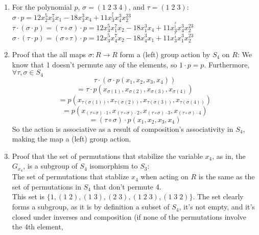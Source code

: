 \documentclass{article}
\begin{document}
    \begin{enumerate}[label=\textbf{\alph*.}]
        \item    
            For the polynomial $p$, $\sigma = (1\;2\;3\;4)$,
            and $\tau = (1\;2\;3)$: \\
            $\sigma \cdot p
            = 12x_2^5x_3^7x_1 - 18x_3^3x_4 + 11x_3^^x_1x_4^3x_2^{23}$ \\
            $\tau \cdot (\sigma \cdot p) = (\tau \circ \sigma) \cdot p
            = 12x_3^5x_1^7x_2 - 18x_1^3x_4 + 11x_3^^x_1x_4^3x_2^{23}$ \\
            $\sigma \cdot (\tau \cdot p) = (\sigma \circ \tau) \cdot p
            = 12x_3^5x_4^7x_2 - 18x_4^3x_1 + 11x_3^^x_4x_1^3x_2^{23}$ \\
        \item
            Proof that the all maps $\sigma: R \to R$
            form a (left) group action by $S_4$ on $R$:
            We know that 1 doesn't permute any of the elements,
            so $1 \cdot p = p$.
            Furthermore, $\forall \tau, \sigma \in S_4$
            \[\tau \cdot (\sigma \cdot p(x_1, x_2, x_3, x_4)) \]
            \[ = \tau \cdot p(x_{\sigma(1)}, x_{\sigma(2)},
            x_{\sigma(3)}, x_{\sigma(4)}) \]
            \[= p(x_{\tau(\sigma(1))}, x_{\tau(\sigma(2))},
            x_{\tau(\sigma(3))}, x_{\tau(\sigma(4))}) \]
            \[ = p(x_{(\tau \circ \sigma) \cdot 1},
            x_{(\tau \circ \sigma) \cdot 2},
            x_{(\tau \circ \sigma) \cdot 3},
            x_{(\tau \circ \sigma) \cdot 4}) \]
            \[= (\tau \circ \sigma) \cdot p(x_1, x_2, x_3, x_4) \]
            So the action is associative as a result of composition's
            associativity in $S_4$,
            making the map a (left) group action.
        \item
            Proof that the set of permutations that stabilize
            the variable $x_4$, as in, the $G_{x_4}$,
            is a subgroup of $S_4$ isomorphism to $S_3$: \\
            The set of permutations that stablize $x_4$ 
            when acting on $R$
            is the same as the set of permutations in $S_4$
            that don't permute 4. \\
            This set is $\{1, (1\;2), (1\;3), (2\;3), (1\;2\;3), (1\;3\;2)\}$.
            The set clearly forms a subgroup,
            as it is by definition a subset of $S_4$,
            it's not empty,
            and it's closed under inverses and composition
            (if none of the permutations involve the 4th element,

\end{enumerate}
\end{document}
